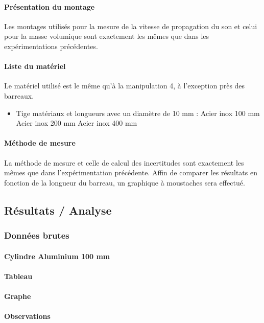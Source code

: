 \paragraph{Présentation du montage}
Les montages utilisés pour la mesure de la vitesse de propagation du son et celui pour la masse volumique 
sont exactement les mêmes que dans les expérimentations précédentes. 

\paragraph{Liste du matériel}
Le matériel utilisé est le même qu'à la manipulation 4, à l'exception près des barreaux.
\begin{itemize}   
    \item Tige matériaux et longueurs avec un diamètre de 10 mm :
    \subitem Acier inox 100 mm
    \subitem Acier inox 200 mm
    \subitem Acier inox 400 mm
\end{itemize}
\paragraph{Méthode de mesure}
La méthode de mesure et celle de calcul des incertitudes sont exactement les mêmes que dans 
l'expérimentation précédente. Affin de comparer les résultats en fonction de la longueur du barreau, 
un graphique à moustaches sera effectué.

\newpage

\subsection{\large Résultats / Analyse}
\subsubsection{\large Données brutes}
\paragraph{\large Cylindre Aluminium 100 mm}
\paragraph{Tableau}
\paragraph{Graphe}
\paragraph{Observations}

